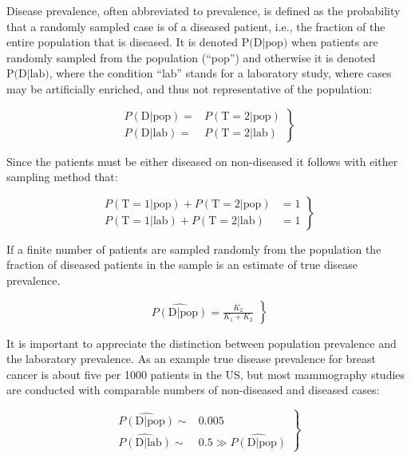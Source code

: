 \documentclass[
]{book}
\begin{document}
Disease prevalence, often abbreviated to prevalence, is defined as the probability that a randomly sampled case is of a diseased patient, i.e., the fraction of the entire population that is diseased. It is denoted \(\text{P(D|pop)}\) when patients are randomly sampled from the population (``pop'') and otherwise it is denoted \(\text{P(D|lab)}\), where the condition ``lab'' stands for a laboratory study, where cases may be artificially enriched, and thus not representative of the population:

\begin{equation} 
\left.
\begin{aligned}  
P(\text{D}|\text{pop})=&P(\text{T}=2|\text{pop})\\
P(\text{D}|\text{lab})=&P(\text{T}=2|\text{lab})
\end{aligned}
\right \}
\label{eq:binary-task-dis-prev}
\end{equation}

Since the patients must be either diseased on non-diseased it follows with either sampling method that:

\begin{equation} 
\left.
\begin{aligned}  
P(\text{T}=1|\text{pop})+P(\text{T}=2|\text{pop})&=1\\
P(\text{T}=1|\text{lab})+P(\text{T}=2|\text{lab})&=1
\end{aligned}
\right \}
\end{equation}

If a finite number of patients are sampled randomly from the population the fraction of diseased patients in the sample is an estimate of true disease prevalence.

\begin{equation} 
\left.
\begin{aligned}  
\widehat{P(\text{D}|\text{pop})}=
\frac{K_2}{K_1+K_2}
\end{aligned}
\right \}
\label{eq:binary-task-dis-prev-est}
\end{equation}

It is important to appreciate the distinction between population prevalence and the laboratory prevalence. As an example true disease prevalence for breast cancer is about five per 1000 patients in the US, but most mammography studies are conducted with comparable numbers of non-diseased and diseased cases:

\begin{equation} 
\left.
\begin{aligned}  
\widehat{P(\text{D}|\text{pop})}\sim& 0.005\\
\widehat{P(\text{D}|\text{lab})}\sim& 0.5\gg \widehat{P(\text{D}|\text{pop})}
\end{aligned}
\right \}
\label{eq:binary-task-dis-prev-lab-vs-pop}
\end{equation}
\end{document}
